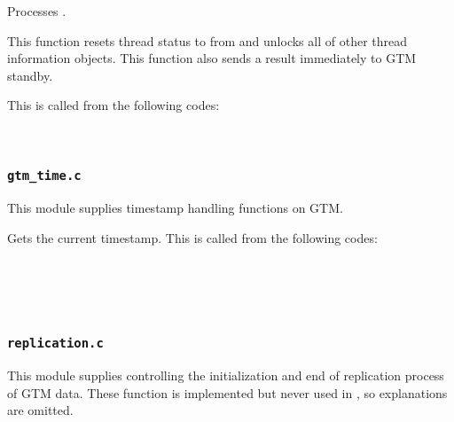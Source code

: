   
    Processes .
    
    This function resets thread status to  from  and unlocks all of other thread information objects.
    This function also sends a result immediately to GTM standby.
    
    This is called from the following codes:
    
    \FuncRefHdr
		\\ \hline
    \FuncRefTrailor



\subsubsection{\texttt{gtm\_time.c}}

  This module supplies timestamp handling functions on GTM.
  
  
    Gets the current timestamp.
    This is called from the following codes:
    
	{
		\footnotesize
		\FuncRefHdr
			\\
			\\
			\\ \hline
		\FuncRefTrailor
	}




\subsubsection{\texttt{replication.c}}

  This module supplies controlling the initialization and end of replication process of GTM data.
  These function is implemented but never used in \XC, so explanations are omitted.



